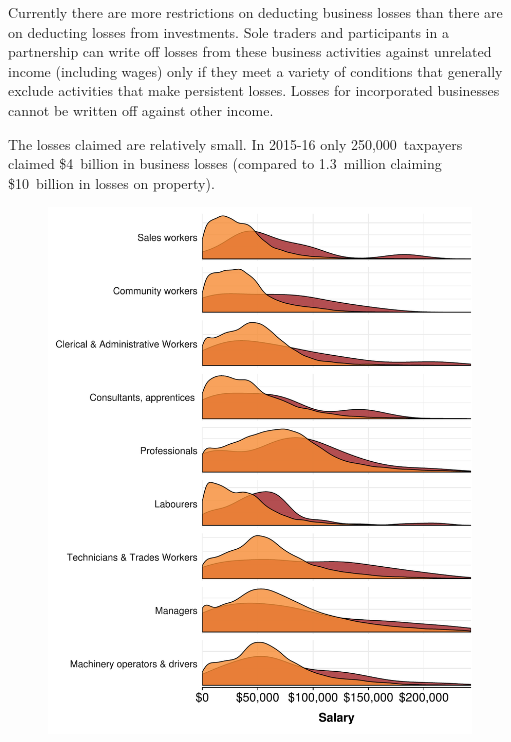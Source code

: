 \documentclass{grattan}\usepackage[]{graphicx}\usepackage[]{color}
\begin{document}
Currently there are more restrictions on deducting business losses than there are on deducting losses from investments. Sole traders and participants in a partnership can write off losses from these business activities against unrelated income (including wages) only if they meet a variety of conditions that generally exclude activities that make persistent losses.  Losses for incorporated businesses cannot be written off against other income. 



The losses claimed are relatively small. In 2015-16 only 250,000~taxpayers claimed \$4~billion in business losses (compared to 1.3~million claiming \$10~billion in losses on property).

\TBD{\dots}



\begin{figure}










\includegraphics[width=\columnwidth]{CGT-NG-atlas//density-salary-by-PP-losses-1}
\end{figure}
\end{document}
